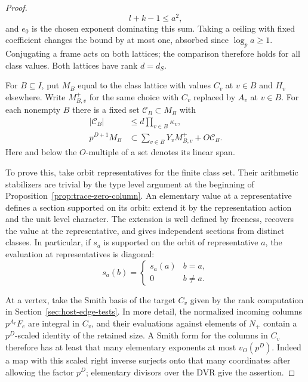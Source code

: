 \begin{proof}
\[
  l+k-1\le a^2,
\]
 and \(e_0\) is the chosen exponent dominating
this sum. Taking a ceiling with fixed coefficient changes the bound
by at most one, absorbed since \(\log_p a\ge1\). Conjugating a
frame acts on both lattices; the comparison therefore holds for all
class values. Both lattices have rank \(d=d_S\).


For \(B\subseteq I\), put \(M_B\) equal to the class lattice with
values \(C_v\) at \(v\in B\) and \(H_v\) elsewhere. Write
\(M_{B,v}^{+}\) for the same choice with \(C_v\) replaced by
\(A_v\) at \(v\in B\). For each nonempty \(B\) there is a fixed
set \(\mathcal C_B\subset M_B\) with
\[
 \begin{split}
 |\mathcal C_B|&\le d\prod_{v\in B}\kappa_v,\\
 p^{D+1}M_B&\subset
       \sum_{v\in B}Y_v M_{B,v}^{+}+O\mathcal C_B .
 \end{split}                                                     \tag{C3}\label{eq:tag-c3}
\]
Here and below the \(O\)-multiple of a set denotes its linear span.

To prove this, take orbit representatives for the finite class set.
Their arithmetic stabilizers are trivial by the type level argument
at the beginning of Proposition~\ref{prop:trace-zero-column}. An elementary
value at a representative defines a section supported on its orbit:
extend it by the representation action and the unit level character.
The extension is well defined by freeness, recovers the value at the
representative, and gives independent sections from distinct classes.
In particular, if \(s_a\) is supported on the orbit of representative \(a\), the evaluation at representatives is diagonal:
\[
  s_a(b)=\begin{cases}s_a(a)&b=a,\\0&b\ne a.\end{cases}
\]

At a vertex, take the Smith basis of the target \(C_v\) given by
the rank computation in Section~\ref{sec:host-edge-tests}.
In more detail, the normalized incoming columns \(p^{A_r}F_e\)
are integral in \(C_v\), and their evaluations against elements of
\(N_+\) contain a \(p^D\)-scaled identity of the retained size.
A Smith form for the columns in \(C_v\) therefore has at least
that many elementary exponents at most \(v_O(p^D)\).
Indeed a map with this scaled right inverse surjects onto that
many coordinates after allowing the factor \(p^D\); elementary
divisors over the DVR give the assertion.


\end{proof}
